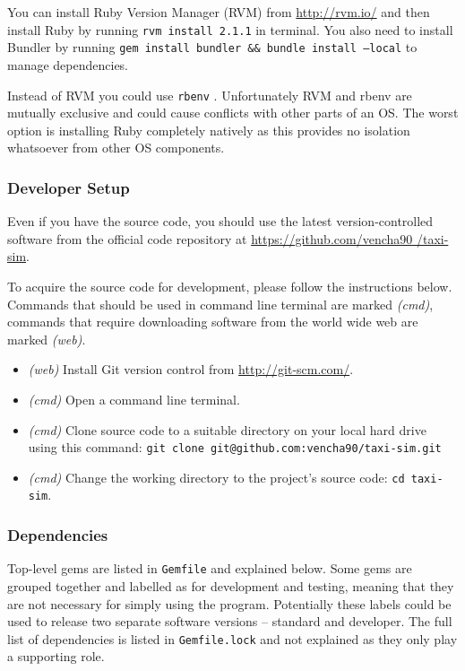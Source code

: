 You can install Ruby Version Manager (RVM) \parencite{Rvm} from
\url{http://rvm.io/} and then install Ruby by running \texttt{rvm install
2.1.1} in terminal. You also need to install Bundler by
running \texttt{gem install bundler \&\& bundle install --local} to manage
dependencies.

Instead of RVM you could use \texttt{rbenv} \parencite{Rbenv}. Unfortunately
RVM and rbenv are mutually exclusive and could cause conflicts with other parts
of an OS. The worst option is installing Ruby completely natively as this
provides no isolation whatsoever from other OS components.


\subsubsection{Developer Setup}

Even if you have the source code, you should use the latest version-controlled
software from the official code repository at \url{https://github.com/vencha90
/taxi-sim}.

To acquire the source code for development, please follow the instructions
below. Commands that should be used in command line terminal are marked
\textit{(cmd)}, commands that require downloading software from the world wide
web are marked \textit{(web)}.

\begin{itemize}
  \item \textit{(web)} Install Git \parencite{Git} version control from
        \url{http://git-scm.com/}.
  \item \textit{(cmd)} Open a command line terminal.
  \item \textit{(cmd)} Clone source code to a suitable directory on your local
        hard drive using this command:
        \texttt{git clone git@github.com:vencha90/taxi-sim.git}
  \item \textit{(cmd)} Change the working directory to the project's source
        code: \texttt{cd taxi-sim}.
\end{itemize}


\subsubsection{Dependencies}

Top-level gems are listed in \texttt{Gemfile} and explained below. Some gems
are grouped together and labelled as for development and testing, meaning that
they are not necessary for simply using the program. Potentially these labels
could be used to release two separate software versions -- standard and
developer. The full list of dependencies is listed in \texttt{Gemfile.lock} and
not explained as they only play a supporting role.


